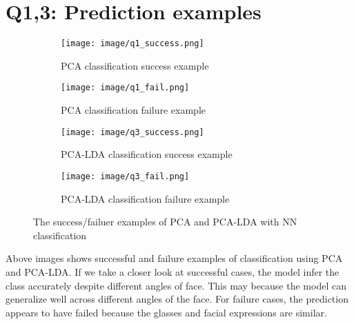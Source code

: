 \newpage
\section{Q1,3: Prediction examples}
\label{subsec:Q13_eg}
\begin{figure}[htbp]
	\centering
        \begin{subfigure}[t]{0.4\linewidth}
        \centering
        \texttt{[image: image/q1\_success.png]}
	\caption{PCA classification success example}
	\label{fig:q3_success}
        \end{subfigure}
    \quad
        \begin{subfigure}[t]{0.4\linewidth}
        \centering
        \texttt{[image: image/q1\_fail.png]}
	\caption{PCA classification failure example}
	\label{fig:q3_fail}
        \end{subfigure}
    \quad
	\begin{subfigure}[t]{0.4\linewidth}
	\centering
	\texttt{[image: image/q3\_success.png]}
	\caption{PCA-LDA classification success example}
	\label{fig:q3_success}
        \end{subfigure}
    \quad
        \begin{subfigure}[t]{0.4\linewidth}
	\centering
	\texttt{[image: image/q3\_fail.png]}
	\caption{PCA-LDA classification failure example}
	\label{fig:q3_fail}
    \end{subfigure}
    \caption{The success/failuer examples of PCA and PCA-LDA with NN classification}
\end{figure}
Above images shows successful and failure examples of classification using PCA and PCA-LDA. If we take a closer look at successful cases, the model infer the class accurately despite different angles of face. This may because the model can generalize well across different angles of the face. For failure cases, the prediction appears to have failed because the glasses and facial expressions are similar.

